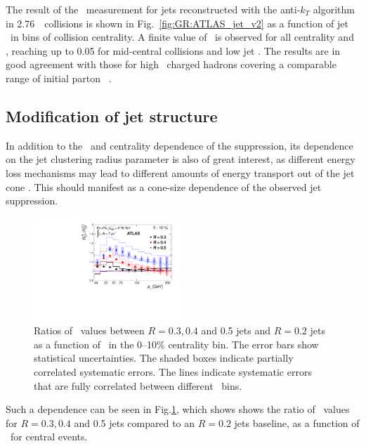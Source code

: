 The result of the \vtwo\ measurement for jets reconstructed with the anti-$k_T$
algorithm in 2.76\TeV\ \PbPb\ collisions is shown in Fig.~\ref{fig:GR:ATLAS_jet_v2}
as a function of jet \pT\ in bins of collision centrality. A finite
value of \vtwo\ is observed for all centrality and \pT, reaching up to 0.05 for
mid-central collisions and low jet \pT. The results are in good agreement
with those for high \pT\ charged hadrons covering a comparable range
of initial parton \pT~\cite{Chatrchyan:2012xq}.

\subsection{Modification of jet structure}

In addition to the \pT\ and centrality dependence of the suppression, its dependence on the
jet clustering radius parameter is also of great interest, as different energy loss
mechanisms may lead to different amounts of energy transport out of the jet cone
\cite{Vitev:2008rz, Vitev:2009rd,He:2011pd}. This should manifest as a cone-size
dependence of the observed jet suppression.
\begin{figure}[!th]
\begin{center}
\includegraphics[width=0.49\textwidth]{jetfigures/ATLAS_jetRCP_size.pdf}
\caption{
Ratios of \Rcp\ values between $R = 0.3, 0.4$ and 0.5 jets and $R =
0.2$ jets as a function of \pT\ in the 0--10\% centrality bin. The
error bars show statistical uncertainties. The shaded boxes
indicate partially correlated systematic errors. The lines indicate
systematic errors that are fully correlated between different \pT\ bins.
}
\label{fig:GR:ATLAS_jetRCP_size}
\end{center}
\end{figure}

Such a dependence can be seen in Fig.\ref{fig:GR:ATLAS_jetRCP_size}, which shows
shows the ratio of \Rcp\ values for $R = 0.3, 0.4$ and 0.5 jets compared
to an $R = 0.2$ jets baseline, as a function of \pT\ for central events.

